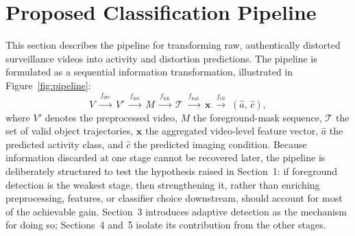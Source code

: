 \documentclass[runningheads]{llncs}
\begin{document}
\section{Proposed Classification Pipeline}

This section describes the pipeline for transforming raw, authentically distorted 
surveillance videos into activity and distortion predictions. The pipeline is 
formulated as a sequential information transformation, illustrated in 
Figure~\ref{fig:pipeline}:
\[
V \;\xrightarrow{f_{\text{pre}}}\; V'
  \;\xrightarrow{f_{\text{det}}}\; M
  \;\xrightarrow{f_{\text{trk}}}\; \mathcal{T}
  \;\xrightarrow{f_{\text{feat}}}\; \mathbf{x}
  \;\xrightarrow{f_{\text{clf}}}\; (\hat{a},\,\hat{c}),
\]
where $V'$ denotes the preprocessed video, $M$ the foreground-mask sequence, 
$\mathcal{T}$ the set of valid object trajectories, $\mathbf{x}$ the aggregated 
video-level feature vector, $\hat{a}$ the predicted activity class, and $\hat{c}$ 
the predicted imaging condition. Because information discarded at one stage cannot 
be recovered later, the pipeline is deliberately structured to test the hypothesis 
raised in Section~1: if foreground detection is the weakest stage, then strengthening 
it, rather than enriching preprocessing, features, or classifier choice downstream, 
should account for most of the achievable gain. Section~3 introduces adaptive 
detection as the mechanism for doing so; Sections~4 and~5 isolate its 
contribution from the other stages.
\end{document}

